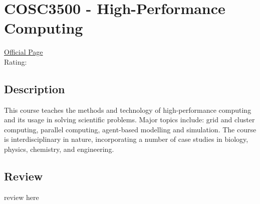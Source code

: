 \hypertarget{COSC3500}{\section{COSC3500 - High-Performance Computing}}

\large
\textcolor{turbo_purple}{\href{https://my.uq.edu.au/programs-courses/course.html?course_code=COSC3500}{Official Page}} \\
Rating: \cstar\cstar\cstar\cstar\ostar

\normalsize
\subsection*{Description}
This course teaches the methods and technology of high-performance computing and its usage in solving scientific problems.
Major topics include: grid and cluster computing, parallel computing, agent-based modelling and simulation.
The course is interdisciplinary in nature, incorporating a number of case studies in biology, physics, chemistry, and engineering.

\subsection*{Review}
review here
